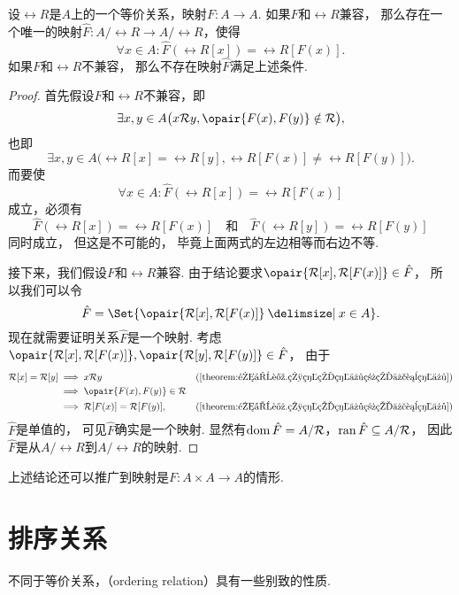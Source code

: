 \begin{theorem}\label{theorem:集合论.与等价关系兼容的映射的性质}
设\(\rel{R}\)是\(A\)上的一个等价关系，映射\(F\colon A \to A\).
如果\(F\)和\(\rel{R}\)兼容，
那么存在一个唯一的映射\(\hat{F}\colon A/\rel{R} \to A/\rel{R}\)，使得\[
	\forall x \in A:
	\hat{F}(\rel{R}[x]) = \rel{R}[F(x)].
\]
如果\(F\)和\(\rel{R}\)不兼容，
那么不存在映射\(\hat{F}\)满足上述条件.
\begin{proof}
首先假设\(F\)和\(\rel{R}\)不兼容，即\[
	\exists x,y \in A \bigl(
		x \rel{R} y,
		\opair{F(x),F(y)} \notin \rel{R}
	\bigr),
\]
也即\[
	\exists x,y \in A \bigl(
		\rel{R}[x] = \rel{R}[y],
		\rel{R}[F(x)] \neq \rel{R}[F(y)]
	\bigr).
\]
而要使\[
	\forall x \in A:
	\hat{F}(\rel{R}[x]) = \rel{R}[F(x)]
\]成立，必须有\[
	\hat{F}(\rel{R}[x])
	= \rel{R}[F(x)]
	\quad\text{和}\quad
	\hat{F}(\rel{R}[y])
	= \rel{R}[F(y)]
\]同时成立，
但这是不可能的，
毕竟上面两式的左边相等而右边不等.

接下来，我们假设\(F\)和\(\rel{R}\)兼容.
由于结论要求\(\opair{\rel{R}[x],\rel{R}[F(x)]} \in \hat{F}\)，
所以我们可以令\[
	\hat{F} = \Set{ \opair{\rel{R}[x],\rel{R}[F(x)]} \given x \in A }.
\]
现在就需要证明关系\(\hat{F}\)是一个映射.
考虑\(\opair{\rel{R}[x],\rel{R}[F(x)]},
\opair{\rel{R}[y],\rel{R}[F(y)]} \in \hat{F}\)，
由于\begin{align*}
	\rel{R}[x] = \rel{R}[y]
	&\implies
	x \rel{R} y
	&(\text{\cref{theorem:集合论.相等的等价类的代表等价}}) \\
	&\implies
	\opair{F(x),F(y)} \in \rel{R} \\
	&\implies
	\rel{R}[F(x)] = \rel{R}[F(y)],
	&(\text{\cref{theorem:集合论.相等的等价类的代表等价}})
\end{align*}
\(\hat{F}\)是单值的，
可见\(\hat{F}\)确实是一个映射.
显然有\(\operatorname{dom} \hat{F} = A/\mathcal{R}\)，\(\operatorname{ran} \hat{F} \subseteq A/\mathcal{R}\)，
因此\(\hat{F}\)是从\(A/\rel{R}\)到\(A/\rel{R}\)的映射.
\end{proof}
\end{theorem}
上述结论还可以推广到映射是\(F\colon A \times A \to A\)的情形.

\section{排序关系}
不同于等价关系，（ordering relation）具有一些别致的性质.

